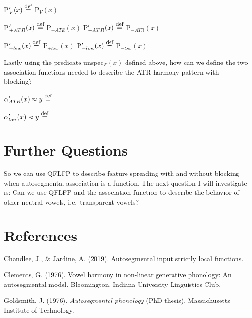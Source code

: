 \documentclass[,doc,floatsintext]{apa6}
\def\defeq{\mathrel{\buildrel \mbox{\footnotesize def} \over =}}
\theoremstyle{definition}
\theoremstyle{definition}
\theoremstyle{definition}
\theoremstyle{remark}
\begin{document}
P\('_{V}(x) \defeq\) P\(_{V}(x)\)

P\('_{+ATR}(x) \defeq\) P\(_{+ATR}(x)\) \hspace{2in}
P\('_{-ATR}(x) \defeq\) P\(_{-ATR}(x)\)

P\('_{+low}(x) \defeq\) P\(_{+low}(x)\) \hspace{2in}
P\('_{-low}(x) \defeq\) P\(_{-low}(x)\)

\newpage

\noindent Lastly using the predicate unspec\(_F(x)\) defined above, how
can we define the two association functions needed to describe the ATR
harmony pattern with blocking?

\noindent \(\alpha_{ATR}'(x)\approx y \defeq\) \vspace{1in}

\noindent \(\alpha_{low}'(x)\approx y \defeq\) \vspace{1in}

\section{Further Questions}\label{further-questions}

So we can use QFLFP to describe feature spreading with and without
blocking when autosegmental association is a function. The next question
I will investigate is: Can we use QFLFP and the association function to
describe the behavior of other neutral vowels, i.e.~transparent vowels?
\vspace{2.5in}

\section{References}\label{references}

\begingroup
\setlength{\parindent}{-0.5in} \setlength{\leftskip}{0.5in}

\hypertarget{refs}{}
\hypertarget{ref-chandleejardineaisl}{}
Chandlee, J., \& Jardine, A. (2019). Autosegmental input strictly local
functions.

\hypertarget{ref-Clements1976}{}
Clements, G. (1976). Vowel harmony in non-linear generative phonology:
An autosegmental model. Bloomington, Indiana University Linguistics
Club.

\hypertarget{ref-Goldsmith1976}{}
Goldsmith, J. (1976). \emph{Autosegmental phonology} (PhD thesis).
Massachusetts Institute of Technology.

\endgroup
\end{document}
